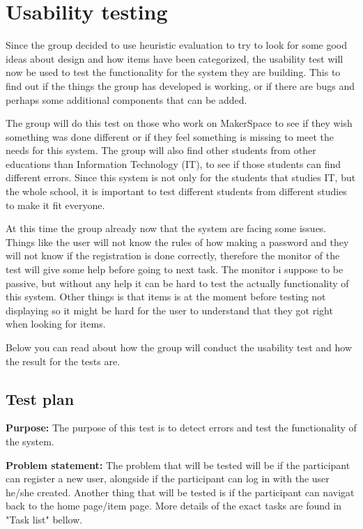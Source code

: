 \section{Usability testing} 
Since the group decided to use heuristic evaluation to try to look for some good ideas about design \cite{heuristic-evaluation} and how items have been 
categorized, the usability test will now be used to test the functionality for the system they are building. This to find out if the things the group has developed is working, or if there are bugs and perhaps some additional components that can be added.

The group will do this test on those who work on MakerSpace to see if they wish something was done different or if they feel something is missing to meet the needs for this system. The group will also find other students from other educations than Information Technology (IT), to see if those students can find different errors. Since this system is not only for the students that studies IT, but the whole school, it is important to test different students from different studies to make it fit everyone.

At this time the group already now that the system are facing some issues. Things like the user will not know the rules of how making a password and they will not know if the registration is done correctly, therefore the monitor of the test will give some help before going to next task. The monitor i suppose to be passive, but without any help it can be hard to test the actually functionality of this system. Other things is that items is at the moment before testing not displaying so it might be hard for the user to understand that they got right when looking for items.

Below you can read about how the group will conduct the usability test and how the result for the tests are.

\subsection{Test plan}
\textbf{Purpose:} The purpose of this test is to detect errors and test the functionality of the system.

\textbf{Problem statement:} The problem that will be tested will be if the participant can register a new user, alongside if the participant can log in with the user he/she created. Another thing that will be tested is if the participant can navigat back to the home page/item page. More details of the exact tasks are found in "Task list" bellow. 


